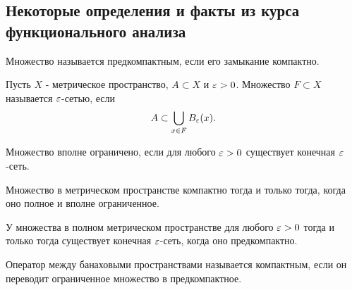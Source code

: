 
\subsection*{Некоторые определения и факты из курса функционального анализа}

\begin{definition}
Множество называется предкомпактным, если его замыкание компактно.
\end{definition}

\begin{definition} Пусть $X$ - метрическое пространство, $A \subset X$ и $\varepsilon > 0$. Множество  $F \subset X$ называется $\varepsilon$-сетью, если
$$ A \subset \bigcup_{x \in F} B_\varepsilon (x).$$
\end{definition}

\begin{definition}
Множество вполне ограничено, если для любого $\varepsilon > 0$ существует конечная $\varepsilon$-сеть.
\end{definition}

\begin{theorem}[Хаусдорф]
Множество в метрическом пространстве компактно тогда и только тогда, когда оно полное и вполне ограниченное. 
\end{theorem}

\begin{corollary}
У множества в полном метрическом пространстве для любого $\varepsilon > 0$ тогда и только тогда существует конечная $\varepsilon$-сеть, когда оно предкомпактно.
\end{corollary}

\begin{definition}
Оператор между банаховыми пространствами называется компактным, если он переводит ограниченное множество в предкомпактное.
\end{definition}

